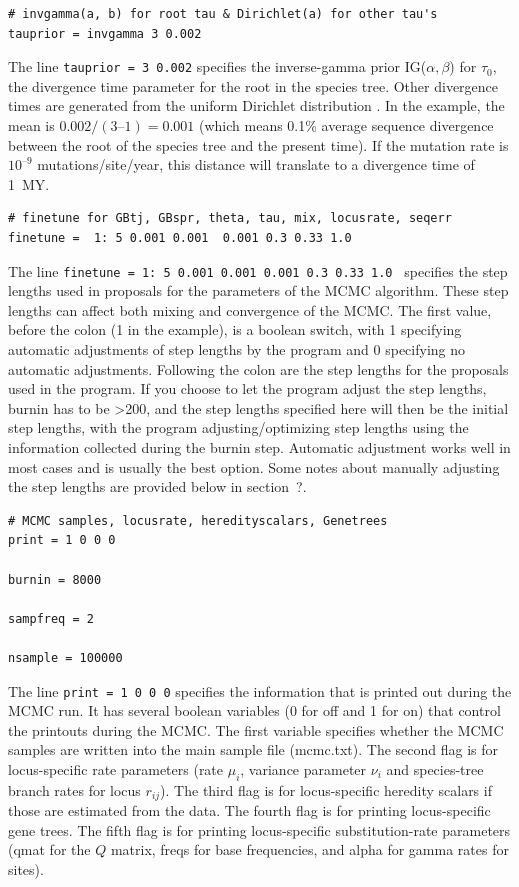 \documentclass[a4paper]{book}
\numberwithin{equation}{section} \renewcommand{\baselinestretch}{0.55}
\begin{document}
\begin{verbatim}
# invgamma(a, b) for root tau & Dirichlet(a) for other tau's
tauprior = invgamma 3 0.002    
\end{verbatim}
The line \texttt{tauprior = 3 0.002} specifies the inverse-gamma prior
IG($\alpha, \beta$) for $\tau_0$, the divergence time parameter for
the root in the species tree.  Other divergence times are generated
from the uniform Dirichlet distribution \citep[][eq.~2]{Yang2010}. In
the example, the mean is $0.002/(3 – 1) = 0.001$ (which means 0.1\%
average sequence divergence between the root of the species tree and
the present time).  If the mutation rate is $10^{–9}$
mutations/site/year, this distance will translate to a divergence time
of 1~MY.

\begin{verbatim}
# finetune for GBtj, GBspr, theta, tau, mix, locusrate, seqerr
finetune =  1: 5 0.001 0.001  0.001 0.3 0.33 1.0  
\end{verbatim}
The line \texttt{finetune = 1: 5 0.001 0.001 0.001 0.3 0.33 1.0 }
specifies the step lengths used in proposals for the parameters of the
MCMC algorithm. These step lengths can affect both mixing and
convergence of the MCMC. The first value, before the colon (1 in the
example), is a boolean switch, with 1 specifying automatic adjustments
of step lengths by the program and 0 specifying no automatic
adjustments.  Following the colon are the step lengths for the
proposals used in the program.  If you choose to let the program
adjust the step lengths, burnin has to be >200, and the step lengths
specified here will then be the initial step lengths, with the program
adjusting/optimizing step lengths using the information collected
during the burnin step. Automatic adjustment works well in most cases
and is usually the best option.  Some notes about manually adjusting
the step lengths are provided below in section~?.

\begin{verbatim}
# MCMC samples, locusrate, heredityscalars, Genetrees
print = 1 0 0 0   

burnin = 8000

sampfreq = 2

nsample = 100000
\end{verbatim}
The line \texttt{print = 1 0 0 0} specifies the information that is
printed out during the MCMC run. It has several boolean variables (0
for off and 1 for on) that control the printouts during the MCMC.  The
first variable specifies whether the MCMC samples are written into the
main sample file (mcmc.txt).  The second flag is for locus-specific
rate parameters (rate $\mu_i$, variance parameter $\nu_i$ and
species-tree branch rates for locus $r_{ij}$). The third flag is for
locus-specific heredity scalars if those are estimated from the data.
The fourth flag is for printing locus-specific gene trees.  The fifth
flag is for printing locus-specific substitution-rate parameters (qmat
for the $Q$ matrix, freqs for base frequencies, and alpha for gamma
rates for sites).
\end{document}
